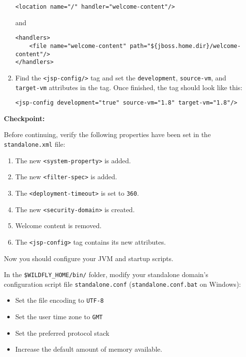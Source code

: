 \begin{enumerate}
\begin{verbatim}
<location name="/" handler="welcome-content"/>
\end{verbatim}

  and

\begin{verbatim}
<handlers>
    <file name="welcome-content" path="${jboss.home.dir}/welcome-content"/>
</handlers>
\end{verbatim}
\item
  Find the \texttt{\textless{}jsp-config/\textgreater{}} tag and set the
  \texttt{development}, \texttt{source-vm}, and \texttt{target-vm}
  attributes in the tag. Once finished, the tag should look like this:

\begin{verbatim}
<jsp-config development="true" source-vm="1.8" target-vm="1.8"/>
\end{verbatim}
\end{enumerate}

\textbf{Checkpoint:}

Before continuing, verify the following properties have been set in the
\texttt{standalone.xml} file:

\begin{enumerate}
\def\labelenumi{\arabic{enumi}.}
\item
  The new \texttt{\textless{}system-property\textgreater{}} is added.
\item
  The new \texttt{\textless{}filter-spec\textgreater{}} is added.
\item
  The \texttt{\textless{}deployment-timeout\textgreater{}} is set to
  \texttt{360}.
\item
  The new \texttt{\textless{}security-domain\textgreater{}} is created.
\item
  Welcome content is removed.
\item
  The \texttt{\textless{}jsp-config\textgreater{}} tag contains its new
  attributes.
\end{enumerate}

Now you should configure your JVM and startup scripts.

In the \texttt{\$WILDFLY\_HOME/bin/} folder, modify your standalone
domain's configuration script file \texttt{standalone.conf}
(\texttt{standalone.conf.bat} on Windows):

\begin{itemize}
\tightlist
\item
  Set the file encoding to \texttt{UTF-8}
\item
  Set the user time zone to \texttt{GMT}
\item
  Set the preferred protocol stack
\item
  Increase the default amount of memory available.
\end{itemize}

